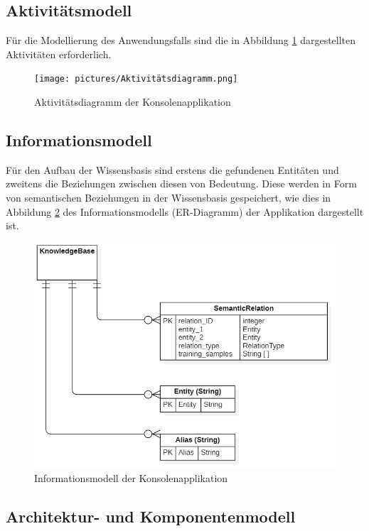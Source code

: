 \subsection{Aktivitätsmodell}

Für die Modellierung des Anwendungsfalls sind die in Abbildung \ref{fig:Aktivitätsmodell} dargestellten Aktivitäten erforderlich.

\begin{figure}[]
    \centering
    \texttt{[image: pictures/Aktivitätsdiagramm.png]}
    \caption{Aktivitätsdiagramm der Konsolenapplikation}
    \label{fig:Aktivitätsmodell}
\end{figure}

\subsection{Informationsmodell}

Für den Aufbau der Wissensbasis sind erstens die gefundenen Entitäten und zweitens die Beziehungen zwischen diesen von Bedeutung. Diese werden in Form von semantischen Beziehungen in der Wissensbasis gespeichert, wie dies in  Abbildung \ref{fig:informationsmodell} des Informationsmodells (ER-Diagramm) der Applikation dargestellt ist.

\begin{figure}[h]
    \centering
    \includegraphics[width=\textwidth]{pictures/Informationsmodell.png}
    \caption{Informationsmodell der Konsolenapplikation}
    \label{fig:informationsmodell}
\end{figure}

\subsection{Architektur- und Komponentenmodell}

